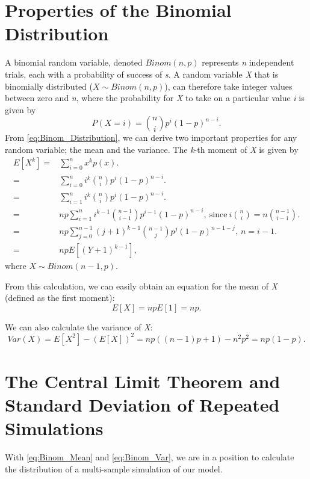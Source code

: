 \documentclass{article}
\begin{document}
	\section{Properties of the Binomial Distribution}
		A binomial random variable, denoted $Binom(n,p)$ represents \textit{n} independent trials, each with a probability of success of \textit{s}. A random variable \textit{X} that is binomially distributed ($X\sim Binom(n,p)$), can therefore take integer values between zero and \textit{n}, where the probability for \textit{X} to take on a particular value \textit{i} is given by
		\begin{equation}
			P(X=i) = \binom{n}{i}p^i(1-p)^{n-i}.
			\label{eq:Binom_Distribution}
		\end{equation}
		From \eqref{eq:Binom_Distribution}, we can derive two important properties for any random variable; the mean and the variance. The \textit{k}-th moment of \textit{X} is given by
		\begin{align*}
			E\left[X^k\right] ={}& \sum_{i=0}^{n}x^kp(x). \\
			={}& \sum_{i=0}^ni^k\binom{n}{i}p^i(1-p)^{n-i}. \\
			={}& \sum_{i=1}^ni^k\binom{n}{i}p^i(1-p)^{n-i}. \\
			={}& np\sum_{i=1}^ni^{k-1}\binom{n-1}{i-1}p^{i-1}(1-p)^{n-i}, \ \text{since} \ i\binom{n}{i}=n\binom{n-1}{i-1}. \\
			={}& np\sum_{j=0}^{n-1}(j+1)^{k-1}\binom{n-1}{j}p^j(1-p)^{n-1-j}, \ n=i-1. \\
			={}& npE\left[(Y+1)^{k-1}\right],
		\end{align*}
		where $X\sim Binom(n-1,p)$.
		
		From this calculation, we can easily obtain an equation for the mean of \textit{X} (defined as the first moment):
		\begin{equation}
			E[X] = npE[1] = np.
			\label{eq:Binom_Mean}
		\end{equation}
		
		We can also calculate the variance of \textit{X}:
		\begin{equation}
			Var(X) = E\left[X^2\right]-(E[X])^2 = np((n-1)p+1)-n^2p^2 = np(1-p).
			\label{eq:Binom_Var}
		\end{equation}
	\section{The Central Limit Theorem and Standard Deviation of Repeated Simulations}
		With \eqref{eq:Binom_Mean} and \eqref{eq:Binom_Var}, we are in a position to calculate the distribution of a multi-sample simulation of our model.
		
\end{document}
